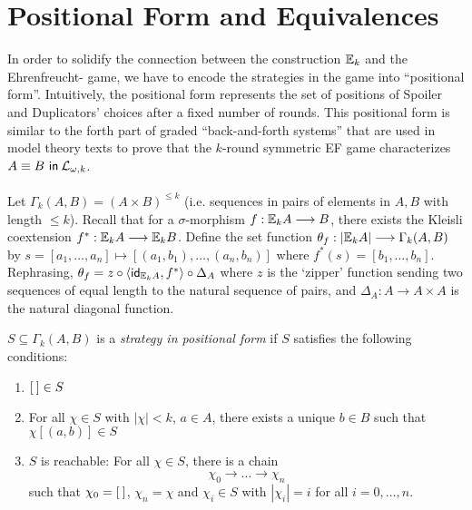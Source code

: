 \section{Positional Form and Equivalences}\label{sec:positionalFormEF}
In order to solidify the connection between the construction ${\mathbb{E}_{k}}$ and the Ehrenfreucht-{\Fraisse} game, we have to encode the strategies in the game into ``positional form''. Intuitively, the positional form represents the set of positions of Spoiler and Duplicators' choices after a fixed number of rounds. This positional form is similar to the forth part of graded ``back-and-forth systems'' that are used in model theory texts to prove that the $k$-round symmetric EF game characterizes ${A \equiv B \ \mathsf{in}\: \mathcal{L}_{\omega,k}}$. \\~\\
Let $\Gamma_{k}(A,B) = (A \times B)^{\leq k}$ (i.e. sequences in pairs of elements in $A,B$ with length $\leq k$). Recall that for a $\sigma$-morphism $f:{\mathbb{E}_{k}A} \longrightarrow B$, there exists the Kleisli coextension $f^{*}:{\mathbb{E}_{k}A} \longrightarrow {\mathbb{E}_{k}B}$. Define the set function $\theta_{f}:|{\mathbb{E}_{k}A}| \longrightarrow \Gamma_{k}(A,B)$ by $s = [a_{1},\dots,a_{n}] \mapsto [(a_{1},b_{1}),\dots,(a_{n},b_{n})]$ where $f^{*}(s) = [b_{1},\dots,b_{n}]$. Rephrasing, $\theta_{f} = z \circ \langle \mathsf{id}_{{\mathbb{E}_{k}A}},f^{*} \rangle \circ \Delta_{A}$ where $z$ is the `zipper' function sending two sequences of equal length to the natural sequence of pairs, and $\Delta_{A}:A \longrightarrow A \times A$ is the natural diagonal function.  
\begin{defn}
$S \subseteq \Gamma_{k}(A,B)$ is a \textit{strategy in positional form} if $S$ satisfies the following conditions:
\begin{enumerate}[label=(S\arabic*),ref=S\arabic*,start=0]
\item ${[\:]} \in S$ \label{eq:S1st}
\item For all $\chi \in S$ with $|\chi| < k$, $a \in A$, there exists a unique $b \in B$ such that $\chi[(a,b)] \in S$ \label{eq:S2nd}
\item $S$ is reachable: For all $\chi \in S$, there is a chain \label{eq:S3rd}
$$\chi_{0} \longrightarrow \dots \longrightarrow \chi_{n}$$
such that $\chi_{0} = {[\:]}$, $\chi_{n} = \chi$ and $\chi_{i} \in S$ with $|\chi_{i}| = i$ for all $i = 0,\dots,n$. 
\end{enumerate}
\end{defn}
